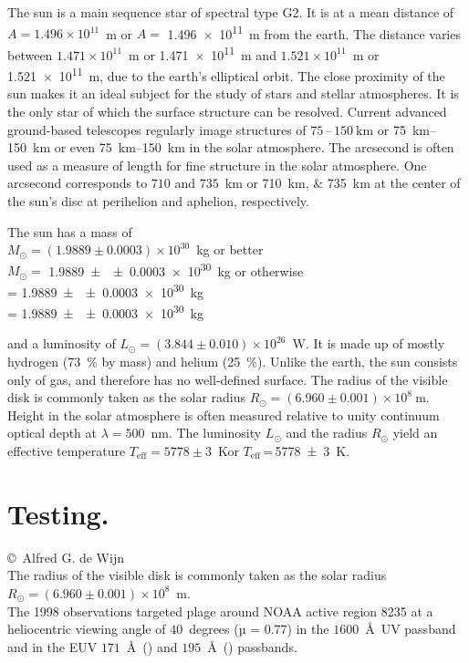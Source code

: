 The sun is a main sequence star of spectral type G2.
It is at a mean distance of $A=1.496\times10^{11}$~m or $A=$ \SI{1.496e11}{\meter} from the earth.
The distance varies between $1.471\times10^{11}$~m or \SI{1.471e11}{\meter} and $1.521\times10^{11}$~m or \SI{1.521e11}{\meter}, due to the earth's elliptical orbit.
The close proximity of the sun makes it an ideal subject for the study of stars and stellar atmospheres.
It is the only star of which the surface structure can be resolved.
Current advanced ground-based telescopes regularly image structures of $75$\,--\,$\SI{150}{\kilo\meter}$ or \SIrange{75}{150}{\kilo\metre} or even \SIrange[range-phrase = --,range-units=single]{75}{150}{\kilo\metre} in the solar atmosphere.
The arcsecond is often used as a measure of length for fine structure in the solar atmosphere.
One arcsecond corresponds to $710$ and $735$~km or \SIlist{710;735}{\kilo\metre} at the center of the sun's disc at perihelion and aphelion, respectively.

The sun has a mass of\\
$M_\odot=(1.9889\pm0.0003)\times10^{30}$~kg or better\\
$M_\odot=$ \SI[multi-part-units = brackets]{1.9889\pm\pm0.0003e30}{\kilogram} or otherwise\\
\si{\MSun} = \SI[multi-part-units = brackets]{1.9889\pm\pm0.0003e30}{\kilogram}\\
\si{\MSun} = \SI[separate-uncertainty = false]{1.9889\pm\pm0.0003e30}{\kilogram}

and a luminosity of $L_\odot=(3.844\pm0.010)\times10^{26}$~W\@.
It is made up of mostly hydrogen (\SI{73}{\percent} by mass) and helium (\SI{25}{\percent}).
Unlike the earth, the sun consists only of gas, and therefore has no well-defined surface.
The radius of the visible disk is commonly taken as the solar radius $R_\odot=(6.960\pm0.001)\times10^8~\mathrm{m}$.
Height in the solar atmosphere is often measured relative to unity continuum optical depth at $\lambda=500$~nm.
The luminosity $L_\odot$ and the radius $R_\odot$ yield an effective temperature $T_\mathrm{eff}=5778\pm3$~K\@ or $T_\mathrm{eff}$\,=\,\SI{5778\pm3}{\kelvin}\@.

\section[Testing]{Testing. \hyperlink{toc}{\hyperback}}

\copyright~Alfred G. de Wijn\\
The radius of the visible disk is commonly taken as the solar radius $R_\odot=(6.960\pm0.001)\times10^8$~m.\\
The 1998 observations targeted plage around NOAA active region 8235 at a heliocentric viewing angle of $40$~degrees (µ = 0.77) in the $1600$~\AA\ UV passband and in the EUV $171$~\AA\ () and $195$~\AA\ () passbands.

